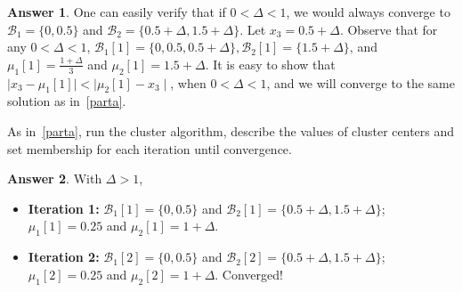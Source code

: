\documentclass{article}
\theoremstyle{definition}
\newtheorem*{answer}{Answer}
\begin{document}
\begin{question}[start=1]
\begin{question}
\begin{question}
\begin{answer}
				One can easily verify that if $0< \Delta < 1$, we would always converge to $\mathcal{B}_{1} = \{0, 0.5\}$ and $\mathcal{B}_{2} = \{0.5+\Delta, 1.5+\Delta\}$. Let $x_3 = 0.5 + \Delta$. Observe that for any $0< \Delta < 1$, $\mathcal{B}_{1}[1] = \{0, 0.5, 0.5 + \Delta\}, \mathcal{B}_{2}[1] = \{1.5+\Delta\}$, and $\mu_{1}[1] = \frac{1+\Delta}{3}$ and $\mu_{2}[1] = 1.5+\Delta$. It is easy to show that $\mid\!x_3 - \mu_{1}[1]\!\mid < \mid\!\mu_{2}[1] - x_3\!\mid$, when $0 < \Delta < 1$, and we will converge to the same solution as in~\ref{parta}.
				
			\end{answer}
			\item As in~\ref{parta}, run the cluster algorithm, describe the values of cluster centers and set membership for each iteration until convergence.
			\begin{answer}
				With $\Delta > 1$,
				\begin{itemize}
					\item \textbf{Iteration 1:} $\mathcal{B}_{1}[1] = \{0, 0.5\}$ and $\mathcal{B}_{2}[1] = \{0.5+\Delta, 1.5+\Delta\}$; $\mu_{1}[1] = 0.25$ and $\mu_{2}[1] = 1+\Delta$.
					\item \textbf{Iteration 2:} $\mathcal{B}_{1}[2] = \{0, 0.5\}$ and $\mathcal{B}_{2}[2] = \{0.5+\Delta, 1.5+\Delta\}$; $\mu_{1}[2] = 0.25$ and $\mu_{2}[2] = 1+\Delta$. Converged!
				\end{itemize}
			\end{answer}
		\end{question}
	\end{question}
	

\end{question}
\end{document}
